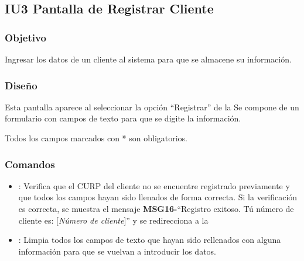 \subsection{IU3 Pantalla de Registrar Cliente}

\subsubsection{Objetivo}
	Ingresar los datos de un cliente al sistema para que se almacene su información.

\subsubsection{Diseño}
Esta pantalla aparece al seleccionar la opción ``Registrar'' de la  Se compone de un formulario con campos de texto para que se digite la información.

Todos los campos marcados con * son obligatorios.


\subsubsection{Comandos}
\begin{itemize}
	\item {}: Verifica que el CURP del cliente no se encuentre registrado previamente y que todos los campos hayan sido llenados de forma correcta. Si la verificación es correcta, se muestra el mensaje {\bf MSG16-}``Registro exitoso. Tú número de cliente es: [{\em Número de cliente}]'' y se redirecciona a la  
\end{itemize}

\begin{itemize}
	\item {}: Limpia todos los campos de texto que hayan sido rellenados con alguna información para que se vuelvan a introducir los datos.
\end{itemize}


